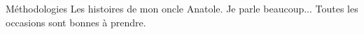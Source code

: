 \begin{rubric}{Méthodologies}
\entry*[Humour] Les histoires de mon oncle Anatole.
\entry*[Enfumage] Je parle beaucoup...
\entry*[Opportunisme] Toutes les occasions sont bonnes à
                      prendre.
\end{rubric}
